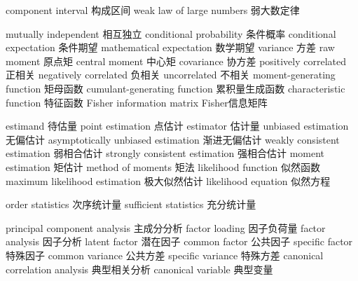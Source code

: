 {component interval} 
{构成区间}
{weak law of large numbers} 
{弱大数定律}


{mutually independent} 
{相互独立}
{conditional probability} 
{条件概率}
{conditional expectation} 
{条件期望}
{mathematical expectation} 
{数学期望}
{variance} 
{方差}
{raw moment} 
{原点矩}
{central moment} 
{中心矩}
{covariance} 
{协方差}
{positively correlated} 
{正相关}
{negatively correlated} 
{负相关}
{uncorrelated} 
{不相关}
{moment-generating function} 
{矩母函数}
{cumulant-generating function} 
{累积量生成函数}
{characteristic function} 
{特征函数}
{Fisher information matrix} 
{Fisher信息矩阵}


{estimand} 
{待估量}
{point estimation} 
{点估计}
{estimator} 
{估计量}
{unbiased estimation} 
{无偏估计}
{asymptotically unbiased estimation} 
{渐进无偏估计}
{weakly consistent estimation} 
{弱相合估计}
{strongly consistent estimation} 
{强相合估计}
{moment estimation} 
{矩估计}
{method of moments} 
{矩法}
{likelihood function} 
{似然函数}
{maximum likelihood estimation} 
{极大似然估计}
{likelihood equation} 
{似然方程}

{order statistics} 
{次序统计量}
{sufficient statistics} 
{充分统计量}

{principal component analysis} 
{主成分分析}
{factor loading} 
{因子负荷量}
{factor analysis} 
{因子分析}
{latent factor} 
{潜在因子}
{common factor} 
{公共因子}
{specific factor} 
{特殊因子}
{common variance} 
{公共方差}
{specific variance} 
{特殊方差}
{canonical correlation analysis} 
{典型相关分析}
{canonical variable} 
{典型变量}

